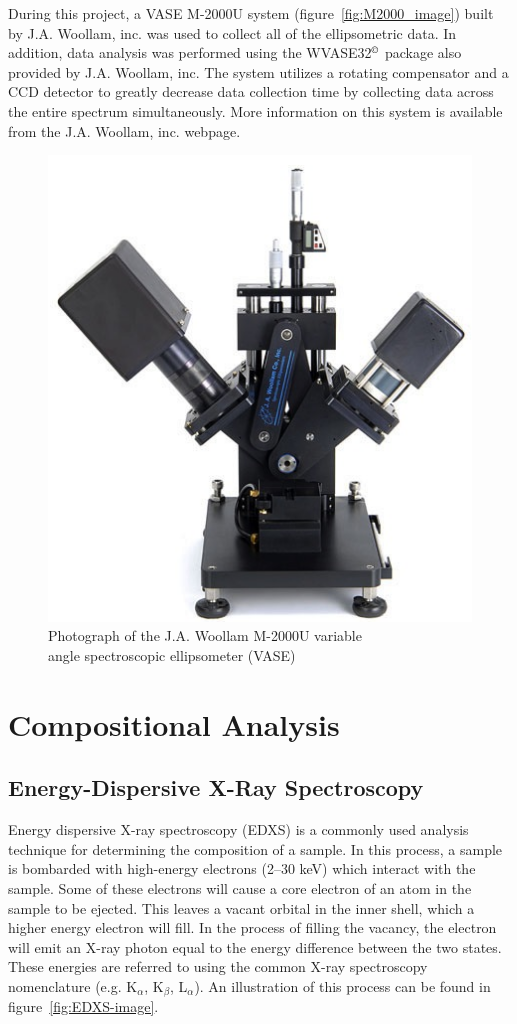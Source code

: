 During this project, a VASE M-2000U system (figure~\vref{fig:M2000_image}) built by J.A. Woollam, inc. was used to collect all of the ellipsometric data. In addition, data analysis was performed using the WVASE32{$^{\copyright}$} package also provided by J.A. Woollam, inc. The system utilizes a rotating compensator and a CCD detector to greatly decrease data collection time by collecting data across the entire spectrum simultaneously.  More information on this system is available from the J.A. Woollam, inc. webpage.\cite{woollam-web}

\begin{figure}[tbp]
   \centering
   \includegraphics[width=0.5\linewidth]{./figures/characterization/M2000_ellipsometer_image.png} 
   \caption[J.A. Woollam M-2000U Ellipsometer]%
   		{Photograph of the J.A. Woollam M-2000U variable \\%
   		 angle spectroscopic ellipsometer (VASE)}
   \label{fig:M2000_image}
\end{figure}





\section{Compositional Analysis}
\label{sec:Charact-Comp}

\subsection{Energy-Dispersive X-Ray Spectroscopy}

Energy dispersive X-ray spectroscopy (EDXS) is a commonly used analysis technique for determining the composition of a sample. In this process, a sample is bombarded with high-energy electrons (2--30 keV) which interact with the sample. Some of these electrons will cause a core electron of an atom in the sample to be ejected. This leaves a vacant orbital in the inner shell, which a higher energy electron will fill. In the process of filling the vacancy, the electron will emit an X-ray photon equal to the energy difference between the two states. These energies are referred to using the common X-ray spectroscopy nomenclature (e.g. K$_{\alpha}$, K$_{\beta}$, L$_{\alpha}$). An illustration of this process can be found in figure~\vref{fig:EDXS-image}.  


